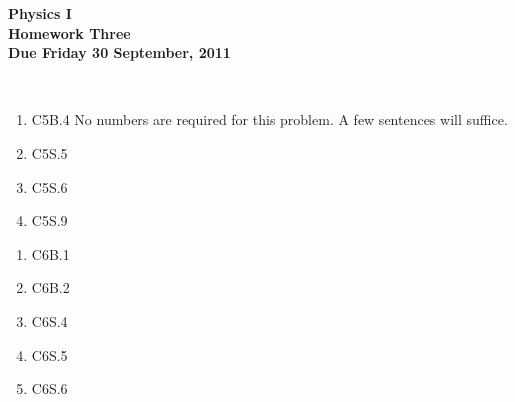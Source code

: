 \documentclass[12pt]{article}
\begin{document}
\pagestyle{empty}
 
\begin{center}
{\large {\bf Physics I}}\\
\medskip
{\large {\bf Homework Three}}\\
\medskip
{ {\bf Due Friday 30 September, 2011}}\\
\end{center}

\hspace{2mm}\\


\begin{enumerate}
\setlength{\itemsep}{-1mm}
  \item C5B.4 No numbers are required for this problem.  A few 
  sentences will suffice.
  \item C5S.5
  \item C5S.6
  \item C5S.9
\end{enumerate}



\begin{enumerate}
\setlength{\itemsep}{-1mm}
  \item C6B.1
  \item C6B.2
  \item C6S.4
  \item C6S.5
  \item C6S.6
\end{enumerate}
\end{document}
